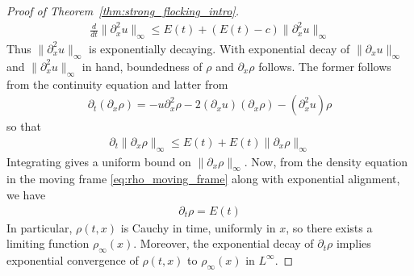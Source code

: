 \documentclass[11pt,letterpaper]{amsart}
\theoremstyle{plain}
\theoremstyle{definition}
\theoremstyle{remark}
\newcommand{\thm}[1]{Theorem~\ref{#1}}
\renewcommand{\leq}{\leqslant}
\begin{document}
\begin{proof}[Proof of \thm{thm:strong_flocking_intro}]
    \begin{align*}
        \frac{d}{dt} \| \partial_x^2 u \|_{\infty} \leq E(t) + (E(t) - c) \|\partial^2_x u\|_{\infty} 
    \end{align*}
    Thus $\|\partial^2_x u\|_{\infty}$ is exponentially decaying. 
    With exponential decay of $\|\partial_x u\|_{\infty}$ and $\|\partial^2_x u\|_{\infty}$ in hand, 
    boundedness of $\rho$ and $\partial_x \rho$ follows. The former follows from the 
    continuity equation and latter from 
    \begin{align*}
        \partial_t (\partial_x \rho) = -u \partial^2_x \rho - 2 (\partial_x u) (\partial_x \rho) - (\partial^2_x u) \rho 
    \end{align*}
    so that 
    \begin{align*}
        \partial_t \|\partial_x \rho\|_{\infty} \leq E(t) + E(t) \|\partial_x \rho\|_{\infty}
    \end{align*}
    Integrating gives a uniform bound on $\|\partial_x \rho\|_{\infty}$. 
    Now, from the density equation in the moving frame \eqref{eq:rho_moving_frame} along 
    with exponential alignment, we have 
    \begin{align*}
        \partial_t \rho = E(t) 
    \end{align*}
    In particular, $\rho(t, x)$ is Cauchy in time, uniformly in $x$, so there exists a limiting function 
    $\rho_{\infty}(x)$.  Moreover, the exponential decay of $\partial_t \rho$ implies exponential convergence of $\rho(t,x)$ to $\rho_{\infty}(x)$ in $L^{\infty}$.  
\end{proof}
\end{document}
